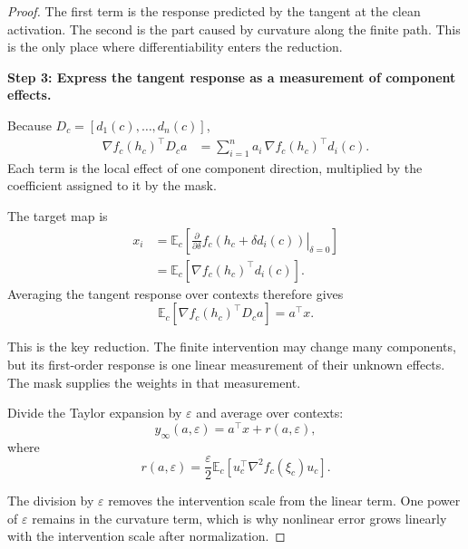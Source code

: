 \documentclass[sigconf,10pt,nonacm,balance=false]{acmart}
\newcommand{\eps}{\varepsilon}
\newcommand{\E}{\mathbb{E}}
\begin{document}
\begin{proof}
The first term is the response predicted by the tangent at the clean activation. The second is the part caused by curvature along the finite path. This is the only place where differentiability enters the reduction.

\noindent\textbf{Step 3: Express the tangent response as a measurement of component effects.}\par

Because $D_c=[d_1(c),\ldots,d_n(c)]$,
\begin{equation}
\begin{aligned}
    \nabla f_c(h_c)^\top D_ca
    &=
    \sum_{i=1}^n
    a_i\,\nabla f_c(h_c)^\top d_i(c).
\end{aligned}
\end{equation}
Each term is the local effect of one component direction, multiplied by the coefficient assigned to it by the mask.

The target map is
\begin{equation}
\begin{aligned}
    x_i
    &=
    \E_c\left[
    \left.
    \frac{\partial}{\partial\delta}
    f_c(h_c+\delta d_i(c))
    \right|_{\delta=0}
    \right]\\
    &=
    \E_c\left[
    \nabla f_c(h_c)^\top d_i(c)
    \right].
\end{aligned}
\end{equation}
Averaging the tangent response over contexts therefore gives
\begin{equation}
    \E_c\left[
    \nabla f_c(h_c)^\top D_ca
    \right]
    =
    a^\top x.
\end{equation}

This is the key reduction. The finite intervention may change many components, but its first-order response is one linear measurement of their unknown effects. The mask supplies the weights in that measurement.

Divide the Taylor expansion by $\eps$ and average over contexts:
\begin{equation}
    y_\infty(a,\eps)
    =
    a^\top x+r(a,\eps),
\end{equation}
where
\begin{equation}
    r(a,\eps)
    =
    \frac{\eps}{2}
    \E_c\left[
    u_c^\top\nabla^2 f_c(\xi_c)u_c
    \right].
\end{equation}

The division by $\eps$ removes the intervention scale from the linear term. One power of $\eps$ remains in the curvature term, which is why nonlinear error grows linearly with the intervention scale after normalization.


\end{proof}
\end{document}
